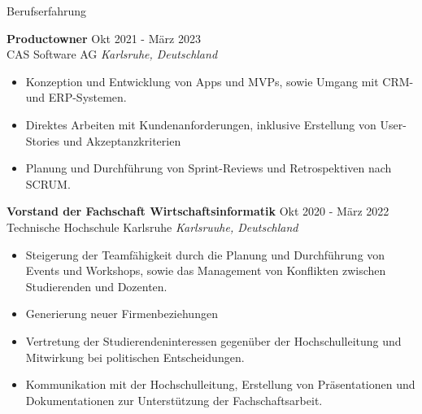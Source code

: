 \documentclass{resume} %
\begin{document}

\begin{rSection}{Berufserfahrung}

    \textbf{Productowner} \hfill Okt 2021 - März 2023\\
    CAS Software AG \hfill \textit{Karlsruhe, Deutschland}
    \begin{itemize}
        \itemsep -3pt {}
        \item \raggedright{Konzeption und Entwicklung von Apps und MVPs, sowie Umgang mit CRM- und ERP-Systemen.}
        \item \raggedright{Direktes Arbeiten mit Kundenanforderungen, inklusive Erstellung von User-Stories und Akzeptanzkriterien}
        \item \raggedright{Planung und Durchführung von Sprint-Reviews und Retrospektiven nach SCRUM.}
    \end{itemize}

    \textbf{Vorstand der Fachschaft Wirtschaftsinformatik} \hfill Okt 2020 - März 2022\\
    Technische Hochschule Karlsruhe \hfill \textit{Karlsruuhe, Deutschland}
    \begin{itemize}
        \itemsep -3pt {}
        \item \raggedright{Steigerung der Teamfähigkeit durch die Planung und Durchführung von Events und Workshops, sowie das Management von Konflikten zwischen Studierenden und Dozenten.} 
        \item \raggedright{Generierung neuer Firmenbeziehungen}
        \item \raggedright{Vertretung der Studierendeninteressen gegenüber der Hochschulleitung und Mitwirkung bei politischen Entscheidungen.}
        \item \raggedright{Kommunikation mit der Hochschulleitung, Erstellung von Präsentationen und Dokumentationen zur Unterstützung der Fachschaftsarbeit.}
    \end{itemize}
\end{rSection}

\end{document}

